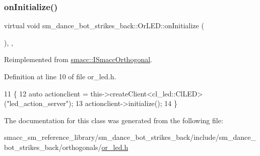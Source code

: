 \subsubsection{\texorpdfstring{on\+Initialize()}{onInitialize()}}
{\footnotesize\ttfamily virtual void sm\+\_\+dance\+\_\+bot\+\_\+strikes\+\_\+back\+::\+Or\+L\+E\+D\+::on\+Initialize (\begin{DoxyParamCaption}{ }\end{DoxyParamCaption})\hspace{0.3cm}{\ttfamily [inline]}, {\ttfamily [override]}, {\ttfamily [virtual]}}



Reimplemented from \hyperlink{classsmacc_1_1ISmaccOrthogonal_a6bb31c620cb64dd7b8417f8705c79c7a}{smacc\+::\+I\+Smacc\+Orthogonal}.



Definition at line 10 of file or\+\_\+led.\+h.


\begin{DoxyCode}
11     \{
12         \textcolor{keyword}{auto} actionclient = this->createClient<cl\_led::ClLED>(\textcolor{stringliteral}{"led\_action\_server"});
13         actionclient->initialize();
14     \}
\end{DoxyCode}


The documentation for this class was generated from the following file\+:\begin{DoxyCompactItemize}
\item 
smacc\+\_\+sm\+\_\+reference\+\_\+library/sm\+\_\+dance\+\_\+bot\+\_\+strikes\+\_\+back/include/sm\+\_\+dance\+\_\+bot\+\_\+strikes\+\_\+back/orthogonals/\hyperlink{sm__dance__bot__strikes__back_2include_2sm__dance__bot__strikes__back_2orthogonals_2or__led_8h}{or\+\_\+led.\+h}\end{DoxyCompactItemize}
